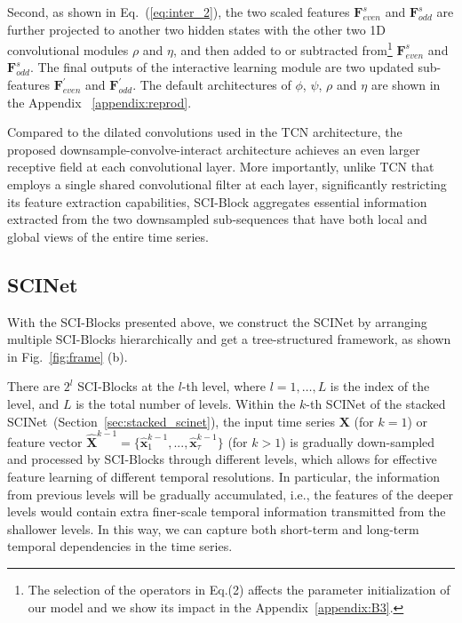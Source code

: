 \documentclass{article}
\begin{document}
Second, as shown in Eq.~(\ref{eq:inter_2}), the two scaled features $\mathbf{F}^{s}_{even}$ and $\mathbf{F}^{s}_{odd}$ are further projected to another two hidden states with the other two 1D convolutional modules $\rho$ and $\eta$, and then added to or subtracted from\footnote{The selection of the operators in Eq.(2) affects the parameter initialization of our model and we show its impact in the Appendix~\ref{appendix:B3}.} $\mathbf{F}^{s}_{even}$ and $\mathbf{F}^{s}_{odd}$.
The final outputs of the interactive learning module are two updated sub-features $\mathbf{F}^{'}_{even}$ and $\mathbf{F}^{'}_{odd}$. The default architectures of $\phi$, $\psi$, $\rho$ and $\eta$ are shown in the Appendix ~\ref{appendix:reprod}. 

Compared to the dilated convolutions used in the TCN architecture, the proposed downsample-convolve-interact architecture achieves an even larger receptive field at each convolutional layer. More importantly, unlike TCN that employs a single shared convolutional filter at each layer, significantly restricting its feature extraction capabilities, SCI-Block aggregates essential information extracted from the two downsampled sub-sequences that have both local and global views of the entire time series.




\subsection{SCINet}
\label{sec:scinet}

With the SCI-Blocks presented above, we construct the SCINet by arranging multiple SCI-Blocks hierarchically and get a tree-structured framework, as shown in Fig.~\ref{fig:frame} (b).  


There are $2^{l}$ SCI-Blocks at the $l$-th level, where $l= 1, \dots, L$ is the index of the level, and $L$ is the total number of levels. 
Within the $k$-th SCINet of the stacked SCINet~(Section~\ref{sec:stacked_scinet}), the input time series $\mathbf{X}$ (for $k\!=\!1$) or feature vector $\hat{\mathbf{X}}^{k-1}\!=\!\{\hat{\mathbf{x}}_{1}^{k-1}, ..., \hat{\mathbf{x}}_{\tau}^{k-1}\}$ (for $k\!>\!1$) is gradually down-sampled and processed by SCI-Blocks through different levels, which allows for effective feature learning of different temporal resolutions. 
In particular, the information from previous levels will be gradually accumulated, i.e., the features of the deeper levels would contain extra finer-scale temporal information transmitted from the shallower levels. 
In this way, we can capture both short-term and long-term temporal dependencies in the time series. 
\end{document}

